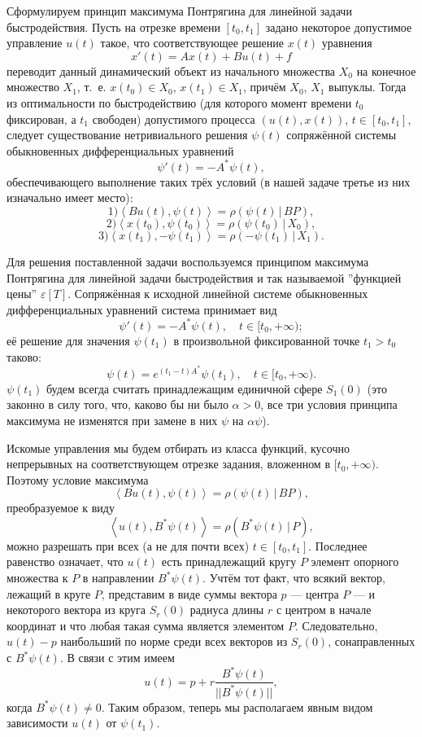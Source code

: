 \documentclass[12pt,titlepage]{article}
\begin{document}
Сформулируем принцип максимума Понтрягина для линейной задачи быстродействия.
Пусть на отрезке времени $ [t_{0}, t_{1}] $ задано некоторое допустимое управление $ u(t) $ такое, что
соответствующее решение $ x(t) $ уравнения
$$
x'(t) = Ax(t) + Bu(t) + f
$$
переводит данный динамический объект из начального множества $ X_{0} $ на конечное множество $ X_{1} $, т.~е. $ x(t_{0}) \in X_{0} $,
$ x(t_{1}) \in X_{1} $, причём $ X_{0} $, $ X_{1} $ выпуклы. Тогда из оптимальности по быстродействию (для которого
момент времени $ t_{0} $ фиксирован, а $ t_{1} $ свободен) допустимого процесса $ (u(t), x(t)) $, $ t \in [t_{0}, t_{1}] $,
следует существование нетривиального решения $ \psi(t) $ сопряжённой системы обыкновенных дифференциальных уравнений
$$
\psi '(t) = -A^{*} \psi(t),
$$
обеспечивающего выполнение таких трёх условий (в нашей задаче третье из них изначально имеет место):
$$
1) \left< Bu(t), \psi(t) \right> = \rho( \psi(t) \,|\, BP ),
$$
$$
2) \left< x(t_{0}), \psi(t_{0}) \right> = \rho( \psi(t_{0}) \,|\, X_{0} ),
$$
$$
3) \left< x(t_{1}), -\psi(t_{1}) \right> = \rho( -\psi(t_{1}) \,|\, X_{1} ).
$$
\normalfont

Для решения поставленной задачи воспользуемся принципом максимума Понтрягина для линейной задачи быстродействия и
так называемой ''функцией цены'' $ \varepsilon[T] $. Сопряжённая к исходной линейной системе обыкновенных дифференциальных уравнений
система принимает вид
$$
\psi '(t) = -A^{*} \psi(t), \quad t \in [t_{0}, +\infty);
$$
её решение для значения $ \psi(t_{1}) $ в произвольной фиксированной точке $ t_{1} > t_{0} $ таково:
$$
\psi(t) = e^{ (t_{1} - t)A^{*} } \psi(t_{1}), \quad t \in [t_{0}, +\infty).
$$
$ \psi(t_{1}) $ будем всегда считать принадлежащим единичной сфере $ S_{1}(0) $ (это законно в силу того, что, каково бы
ни было $ \alpha > 0 $, все три условия принципа максимума не изменятся при замене в них $ \psi $ на $ \alpha \psi $).

Искомые управления мы будем отбирать из класса функций, кусочно непрерывных на соответствующем отрезке задания, вложенном в
$ [t_{0}, +\infty) $. Поэтому условие максимума
$$
\left< Bu(t), \psi(t) \right> = \rho( \psi(t) \,|\, BP ),
$$
преобразуемое к виду
$$
\left< u(t), B^{*}\psi(t) \right> = \rho( B^{*}\psi(t) \,|\, P ),
$$
можно разрешать при всех (а не для почти всех) $ t \in [t_{0}, t_{1}] $. Последнее равенство означает, что $ u(t) $ есть
принадлежащий кругу $ P $ элемент опорного множества к $ P $ в направлении $ B^{*}\psi(t) $. Учтём тот факт, что
всякий вектор, лежащий в круге $ P $, представим в виде суммы вектора $ p $ --- центра $ P $ --- и некоторого вектора
из круга $ S_{r}(0) $ радиуса длины $ r $ с центром в начале координат и что любая такая сумма является элементом $ P $.
Следовательно, $ u(t) - p $ наибольший по норме среди всех векторов из $ S_{r}(0) $, сонаправленных с
$ B^{*}\psi(t) $. В связи с этим имеем
$$
u(t) = p + r \frac{ B^{*}\psi(t) }{ || B^{*}\psi(t) || },
$$
когда $ B^{*}\psi(t) \ne 0 $. Таким образом, теперь мы располагаем явным видом зависимости $ u(t) $ от $ \psi(t_{1}) $.
\end{document}
